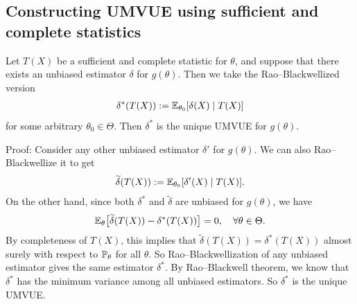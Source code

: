 \documentclass[11pt,letterpaper]{article}
\numberwithin{theorem}{lecture}
\numberwithin{proposition}{lecture}
\numberwithin{lemma}{lecture}
\numberwithin{claim}{lecture}
\numberwithin{corollary}{lecture}
\numberwithin{definition}{lecture}
\numberwithin{conjecture}{lecture}
\numberwithin{remark}{lecture}
\numberwithin{example}{lecture}
\numberwithin{equation}{lecture}
\begin{document}
\subsection{Constructing UMVUE using sufficient and complete statistics}
\begin{theorem}
  Let $T(X)$ be a sufficient and complete statistic for $\theta$, and suppose that there exists an unbiased estimator $\delta$ for $g (\theta)$. Then we take the Rao--Blackwellized version
  \begin{align*}
    \delta^* (T(X)) := {\mathbb{E}}_{\theta_0} [\delta (X) \mid T(X)]
  \end{align*}
  for some arbitrary $\theta_0 \in \Theta$. Then $\delta^*$ is the unique UMVUE for $g (\theta)$.
\end{theorem}
Proof: Consider any other unbiased estimator $\delta'$ for $g (\theta)$. We can also Rao--Blackwellize it to get
\begin{align*}
  \widetilde{\delta} (T(X)) := {\mathbb{E}}_{\theta_0} [\delta' (X) \mid T(X)].
\end{align*}
On the other hand, since both $\delta^*$ and $\widetilde{\delta}$ are unbiased for $g (\theta)$, we have
\begin{align*}
  {\mathbb{E}}_\theta \big[ \widetilde{\delta} (T (X)) - \delta^* (T (X)) \big] = 0, \quad \forall \theta \in \Theta.
\end{align*}
By completeness of $T (X)$, this implies that $\widetilde{\delta} (T (X)) = \delta^* (T (X))$ almost surely with respect to ${\mathbb{P}}_\theta$ for all $\theta$. So Rao--Blackwellization of any unbiased estimator gives the same estimator $\delta^*$. By Rao--Blackwell theorem, we know that $\delta^*$ has the minimum variance among all unbiased estimators. So $\delta^*$ is the unique UMVUE.
\end{document}
